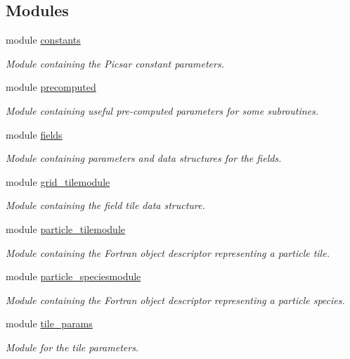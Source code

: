 \subsection*{Modules}
\begin{DoxyCompactItemize}
\item 
module \hyperlink{namespaceconstants}{constants}
\begin{DoxyCompactList}\small\item\em Module containing the Picsar constant parameters. \end{DoxyCompactList}\item 
module \hyperlink{namespaceprecomputed}{precomputed}
\begin{DoxyCompactList}\small\item\em Module containing useful pre-\/computed parameters for some subroutines. \end{DoxyCompactList}\item 
module \hyperlink{namespacefields}{fields}
\begin{DoxyCompactList}\small\item\em Module containing parameters and data structures for the fields. \end{DoxyCompactList}\item 
module \hyperlink{namespacegrid__tilemodule}{grid\+\_\+tilemodule}
\begin{DoxyCompactList}\small\item\em Module containing the field tile data structure. \end{DoxyCompactList}\item 
module \hyperlink{namespaceparticle__tilemodule}{particle\+\_\+tilemodule}
\begin{DoxyCompactList}\small\item\em Module containing the Fortran object descriptor representing a particle tile. \end{DoxyCompactList}\item 
module \hyperlink{namespaceparticle__speciesmodule}{particle\+\_\+speciesmodule}
\begin{DoxyCompactList}\small\item\em Module containing the Fortran object descriptor representing a particle species. \end{DoxyCompactList}\item 
module \hyperlink{namespacetile__params}{tile\+\_\+params}
\begin{DoxyCompactList}\small\item\em Module for the tile parameters. \end{DoxyCompactList}\item 

\end{DoxyCompactItemize}
